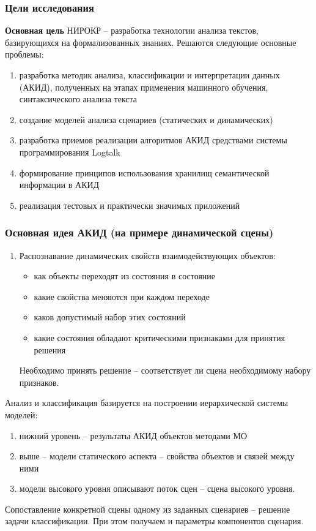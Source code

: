 \documentclass[10pt]{beamer}
\begin{document}
\begin{frame}
  \frametitle{Цели исследования}
  \textbf{Основная цель} НИРОКР -- разработка технологии анализа текстов, базирующихся на формализованных знаниях. Решаются следующие основные проблемы:
  \begin{enumerate}
  \item разработка методик анализа, классификации и интерпретации данных (АКИД), полученных на этапах применения машинного обучения, синтаксического анализа текста
  \item создание моделей анализа сценариев (статических и динамических) %
  \item разработка приемов реализации алгоритмов АКИД средствами системы программирования Logtalk
  \item формирование принципов использования хранилищ семантической информации в АКИД
  \item реализация тестовых и практически значимых приложений
  \end{enumerate}
\end{frame}
\begin{frame}
  \frametitle{Основная идея АКИД (на примере динамической сцены)}
  \begin{enumerate}
  \item Распознавание динамических свойств взаимодействующих объектов:
    \begin{itemize}
    \item как объекты переходят из состояния в состояние
    \item какие свойства меняются при каждом переходе
    \item каков допустимый набор этих состояний
    \item какие состояния обладают критическими признаками для принятия решения
    \end{itemize}
   Необходимо принять решение -- соответствует ли сцена необходимому набору признаков.
  \end{enumerate}

  Анализ и классификация базируется на построении иерархической системы моделей:
  \begin{enumerate}
  \item нижний уровень -- результаты АКИД объектов методами МО
  \item выше -- модели статического аспекта -- свойства объектов и связей между ними
  \item модели высокого уровня описывают поток сцен -- сцена высокого уровня.
  \end{enumerate}

Сопоставление конкретной сцены одному из заданных сценариев -- решение задачи классификации. При этом получаем и параметры компонентов сценария.
\end{frame}
\end{document}
